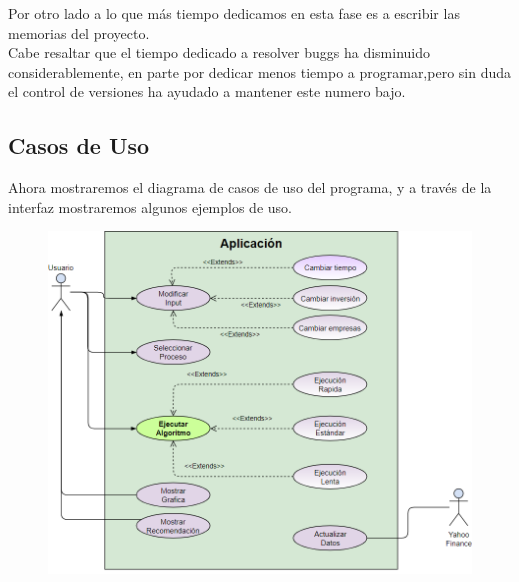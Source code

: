 \documentclass[12pt,a4paper]{article}
\begin{document}
	Por otro lado a lo que más tiempo dedicamos en esta fase es a escribir las memorias del proyecto.\\
	Cabe resaltar que el tiempo dedicado a resolver buggs ha disminuido considerablemente, en parte por dedicar menos tiempo a programar,pero sin duda el control de versiones ha ayudado a mantener este numero bajo.\\
	\subsection{Casos de Uso}
	
	Ahora mostraremos el diagrama de casos de uso del programa, y a través de la interfaz mostraremos algunos ejemplos de uso.\\
\begin{figure}[H]
\centering
  \centering
  \includegraphics[width=1\linewidth]{casos de uso}
\label{fig:subrgrafo}
\end{figure}
	
\end{document}
